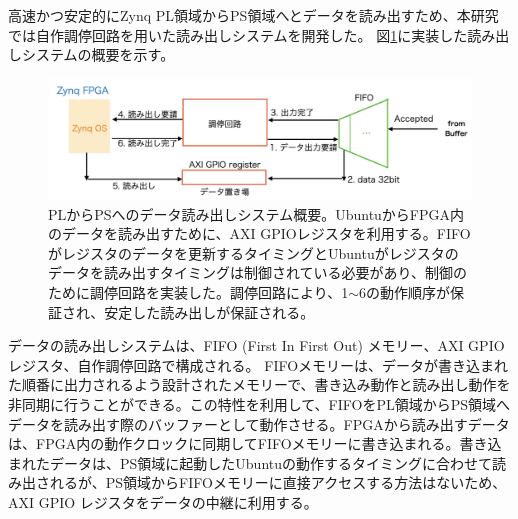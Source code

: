 


高速かつ安定的にZynq PL領域からPS領域へとデータを読み出すため、本研究では自作調停回路を用いた読み出しシステムを開発した。
図\ref{JATHubarbitor}に実装した読み出しシステムの概要を示す。

\begin{figure} 
\centering
\includegraphics[width=16cm]{fig/QAQC/JATHubarbitator.png}
\caption[PLからPSへのデータ読み出しシステム概要]{PLからPSへのデータ読み出しシステム概要。UbuntuからFPGA内のデータを読み出すために、AXI GPIOレジスタを利用する。FIFOがレジスタのデータを更新するタイミングとUbuntuがレジスタのデータを読み出すタイミングは制御されている必要があり、制御のために調停回路を実装した。調停回路により、1$\sim$6の動作順序が保証され、安定した読み出しが保証される。}
\label{JATHubarbitor}
\end{figure}

データの読み出しシステムは、FIFO (First In First Out) メモリー、AXI GPIO レジスタ、自作調停回路で構成される。
FIFOメモリーは、データが書き込まれた順番に出力されるよう設計されたメモリーで、書き込み動作と読み出し動作を非同期に行うことができる。この特性を利用して、FIFOをPL領域からPS領域へデータを読み出す際のバッファーとして動作させる。FPGAから読み出すデータは、FPGA内の動作クロックに同期してFIFOメモリーに書き込まれる。書き込まれたデータは、PS領域に起動したUbuntuの動作するタイミングに合わせて読み出されるが、PS領域からFIFOメモリーに直接アクセスする方法はないため、AXI GPIO レジスタをデータの中継に利用する。

